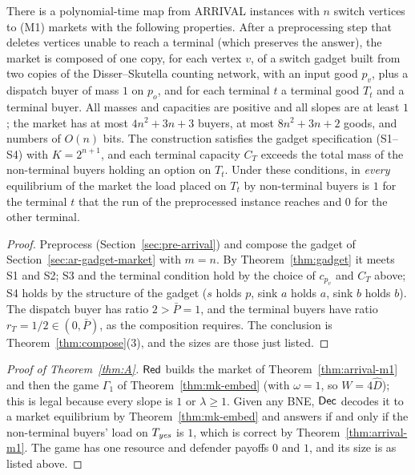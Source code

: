 \begin{theorem}[ARRIVAL to (M1)]\label{thm:arrival-m1}
\statusrefereed
There is a polynomial-time map from ARRIVAL instances with $n$ switch vertices to (M1) markets with the
following properties. After a preprocessing step that deletes vertices unable to reach a terminal (which
preserves the answer), the market is composed of one copy, for each vertex $v$, of a switch gadget built
from two copies of the Disser--Skutella counting network, with an input good $p_v$, plus a dispatch buyer
of mass $1$ on $p_o$, and for each terminal $t$ a terminal good $T_t$ and a terminal buyer. All masses
and capacities are positive and all slopes are at least $1$; the market has at most $4n^2+3n+3$
buyers, at most $8n^2+3n+2$ goods, and numbers of $O(n)$ bits. The construction satisfies the gadget specification
(S1--S4) with $K=2^{n+1}$, and each terminal capacity $C_T$ exceeds the total mass of the non-terminal
buyers holding an option on $T_t$. Under these conditions, in \emph{every} equilibrium of the market the
load placed on $T_t$ by non-terminal buyers is $1$ for the terminal $t$ that the run of the preprocessed instance reaches and $0$ for
the other terminal.
\end{theorem}

\begin{proof}
Preprocess (Section~\ref{sec:pre-arrival}) and compose the gadget of
Section~\ref{sec:ar-gadget-market} with $m=n$. By Theorem~\ref{thm:gadget} it meets S1 and S2; S3 and
the terminal condition hold by the choice of $c_{p_v}$ and $C_T$ above; S4 holds by the structure of the
gadget ($s$ holds $p$, sink $a$ holds $a$, sink $b$ holds $b$). The dispatch buyer has ratio $2>\bar P=1$,
and the terminal buyers have ratio $r_T=1/2\in(0,\bar P)$, as the composition requires. The conclusion is
Theorem~\ref{thm:compose}(3), and the sizes are those just listed.
\end{proof}

\begin{proof}[Proof of Theorem~\ref{thm:A}]
$\mathsf{Red}$ builds the market of Theorem~\ref{thm:arrival-m1} and then the game $\Gamma_1$ of
Theorem~\ref{thm:mk-embed} (with $\omega=1$, so $W=4\hat D$); this is legal because every slope is $1$
or $\lambda\ge1$. Given any BNE, $\mathsf{Dec}$ decodes it to a market equilibrium by Theorem~\ref{thm:mk-embed}
and answers \yes{} if and only if the non-terminal buyers' load on $T_{\textit{yes}}$ is $1$, which is correct
by Theorem~\ref{thm:arrival-m1}. The game has one resource and defender payoffs $0$ and $1$, and its size
is as listed above.
\end{proof}

